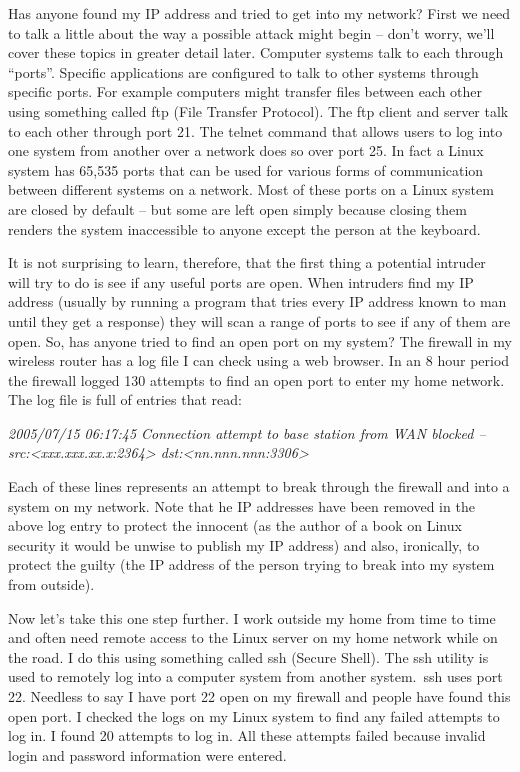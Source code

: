 Has anyone found my IP address and tried to get into my network? First we need
to talk a little about the way a possible attack might begin – don’t worry,
we’ll cover these topics in greater detail later. Computer systems talk to each
through “ports”. Specific applications are configured to talk to other systems
through specific ports. For example computers might transfer files between each
other using something called ftp (File Transfer Protocol). The ftp client and
server talk to each other through port 21. The telnet command that allows users
to log into one system from another over a network does so over port 25. In fact
a Linux system has 65,535 ports that can be used for various forms of
communication between different systems on a network. Most of these ports on a
Linux system are closed by default – but some are left open simply because
closing them renders the system inaccessible to anyone except the person at the
keyboard.



It is not surprising to learn, therefore, that the first thing a potential
intruder will try to do is see if any useful ports are open. When intruders find
my IP address (usually by running a program that tries every IP address known to
man until they get a response) they will scan a range of ports to see if any of
them are open. So, has anyone tried to find an open port on my system? The
firewall in my wireless router has a log file I can check using a web browser.
In an 8 hour period the firewall logged 130 attempts to find an open port to
enter my home network. The log file is full of entries that read: 




\textit{2005/07/15 06:17:45 Connection attempt to base station from WAN blocked
	-- src:<xxx.xxx.xx.x:2364> dst:<nn.nnn.nnn:3306>}




Each of these lines represents an attempt to break through the firewall and into
a system on my network. Note that he IP addresses have been removed in the above
log entry to protect the innocent (as the author of a book on Linux security it
would be unwise to publish my IP address) and also, ironically, to protect the
guilty (the IP address of the person trying to break into my system from
outside). 



Now let’s take this one step further. I work outside my home from time to time
and often need remote access to the Linux server on my home network while on the
road. I do this using something called ssh (Secure Shell). The ssh utility is
used to remotely log into a computer system from another system.\ ssh uses port
22. Needless to say I have port 22 open on my firewall and people have found
this open port. I checked the logs on my Linux system to find any failed
attempts to log in. I found 20 attempts to log in. All these attempts failed
because invalid login and password information were entered.



